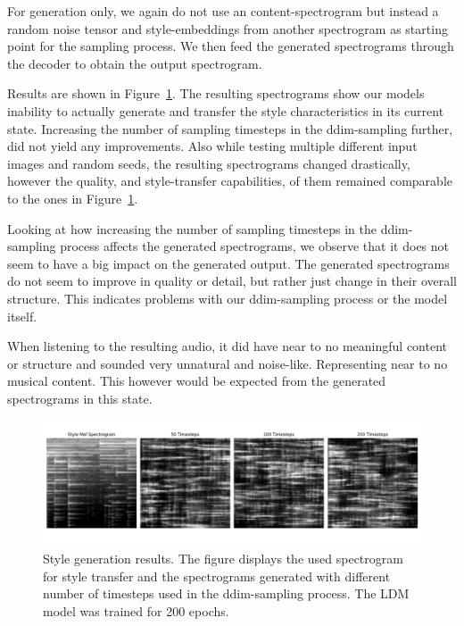For generation only, we again do not use an content-spectrogram but instead a random noise tensor and style-embeddings from another spectrogram as starting point for the sampling process.
We then feed the generated spectrograms through the decoder to obtain the output spectrogram.

Results are shown in Figure~\ref{fig:style_generation_results}.
The resulting spectrograms show our models inability to actually generate and transfer the style characteristics in its current state.
Increasing the number of sampling timesteps in the ddim-sampling further, did not yield any improvements.
Also while testing multiple different input images and random seeds, the resulting spectrograms changed drastically, 
however the quality, and style-transfer capabilities, of them remained comparable to the ones in Figure~\ref{fig:style_generation_results}.

Looking at how increasing the number of sampling timesteps in the ddim-sampling process affects the generated spectrograms,
we observe that it does not seem to have a big impact on the generated output.
The generated spectrograms do not seem to improve in quality or detail, but rather just change in their overall structure.
This indicates problems with our ddim-sampling process or the model itself.

When listening to the resulting audio, it did have near to no meaningful content or structure and sounded very unnatural and noise-like.
Representing near to no musical content. This however would be expected from the generated spectrograms in this state.



\begin{figure}[h]
    \centering
    \includegraphics[width=\textwidth]{figures/generated_mel_spectrograms_comparison_200ep.png}
    \caption{Style generation results. 
    The figure displays the used spectrogram for style transfer and the spectrograms generated with different number of timesteps used in the ddim-sampling process. 
    The LDM model was trained for 200 epochs.}
    \label{fig:style_generation_results}
\end{figure}


